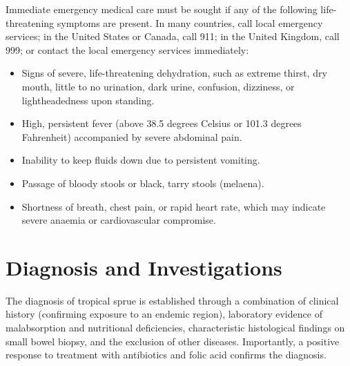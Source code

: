 Immediate emergency medical care must be sought if any of the following life-threatening symptoms are present. In many countries, call local emergency services; in the United States or Canada, call 911; in the United Kingdom, call 999; or contact the local emergency services immediately:
\begin{itemize}
    \item Signs of severe, life-threatening dehydration, such as extreme thirst, dry mouth, little to no urination, dark urine, confusion, dizziness, or lightheadedness upon standing.
    \item High, persistent fever (above 38.5 degrees Celsius or 101.3 degrees Fahrenheit) accompanied by severe abdominal pain.
    \item Inability to keep fluids down due to persistent vomiting.
    \item Passage of bloody stools or black, tarry stools (melaena).
    \item Shortness of breath, chest pain, or rapid heart rate, which may indicate severe anaemia or cardiovascular compromise.
\end{itemize}

\section*{Diagnosis and Investigations}
The diagnosis of tropical sprue is established through a combination of clinical history (confirming exposure to an endemic region), laboratory evidence of malabsorption and nutritional deficiencies, characteristic histological findings on small bowel biopsy, and the exclusion of other diseases. Importantly, a positive response to treatment with antibiotics and folic acid confirms the diagnosis.

